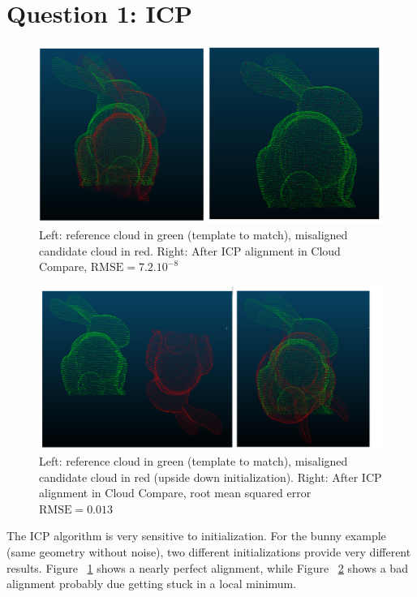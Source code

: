 \documentclass[a4paper]{article}
\begin{document}





\section*{Question 1: ICP}
\begin{figure}[ht]
    \centering
    \includegraphics[width=0.8\linewidth]{figures/bunny_icp_cloud_compare.png}
    \caption{Left: reference cloud in green (template to match), misaligned candidate cloud in red. Right: After ICP alignment in Cloud Compare, $\text{RMSE}=7.2. 10^{-8}$}
    \label{fig:CC_alignment_ok}
\end{figure}

\begin{figure}[ht]
    \centering
    \includegraphics[width=0.8\linewidth]{figures/bunny_icp_upside_down_cloud_compare.png}
    \caption{Left: reference cloud in green (template to match), misaligned candidate cloud in red (upside down initialization). 
    Right: After ICP alignment in Cloud Compare, root mean squared error $\text{RMSE}=0.013$}
    \label{fig:CC_alignment_nok}
\end{figure}

The ICP algorithm is very sensitive to initialization. For the bunny example (same geometry without noise), two different initializations provide very different results.
Figure ~\ref{fig:CC_alignment_ok} shows a nearly perfect alignment, while Figure ~\ref{fig:CC_alignment_nok} shows a bad alignment probably due getting stuck in a local minimum.
\end{document}
